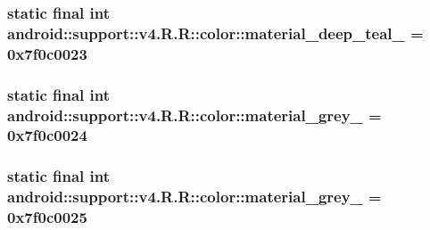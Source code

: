 \hypertarget{classandroid_1_1support_1_1v4_1_1_r_1_1color_8483f49d78fde9d6ca175933c60e2f42}{
\subsubsection[{material\_\-deep\_\-teal\_\-500}]{\setlength{\rightskip}{0pt plus 5cm}static final int android::support::v4.R.R::color::material\_\-deep\_\-teal\_ = 0x7f0c0023}}
\label{classandroid_1_1support_1_1v4_1_1_r_1_1color_8483f49d78fde9d6ca175933c60e2f42}


\hypertarget{classandroid_1_1support_1_1v4_1_1_r_1_1color_148f2d0dbc9acf65a866c6d248bd21d6}{
\subsubsection[{material\_\-grey\_\-100}]{\setlength{\rightskip}{0pt plus 5cm}static final int android::support::v4.R.R::color::material\_\-grey\_ = 0x7f0c0024}}
\label{classandroid_1_1support_1_1v4_1_1_r_1_1color_148f2d0dbc9acf65a866c6d248bd21d6}


\hypertarget{classandroid_1_1support_1_1v4_1_1_r_1_1color_1df4d2c510b0db4286841ba585e3214a}{
\subsubsection[{material\_\-grey\_\-300}]{\setlength{\rightskip}{0pt plus 5cm}static final int android::support::v4.R.R::color::material\_\-grey\_ = 0x7f0c0025}}
\label{classandroid_1_1support_1_1v4_1_1_r_1_1color_1df4d2c510b0db4286841ba585e3214a}


